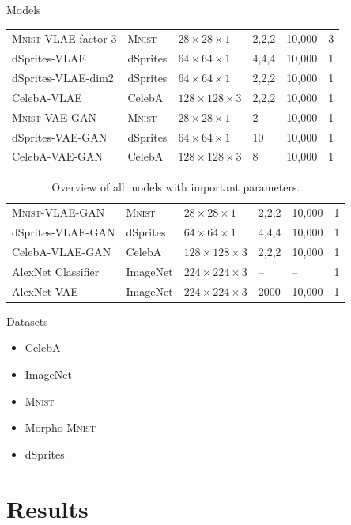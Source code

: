 \documentclass{beamer}
\begin{document}
\begin{frame}{Models}
\begin{table}[H]
\begin{tabularx}{\textwidth}{lXXXXX}
\textsc{Mnist}-VLAE-factor-3 & \textsc{Mnist} & $28\times 28\times 1$ & 2,2,2 & 10,000 & 3 \\
dSprites-VLAE & dSprites & $64\times 64\times 1$ & 4,4,4 & 10,000 & 1 \\
dSprites-VLAE-dim2 & dSprites & $64\times 64\times 1$ & 2,2,2 & 10,000 & 1 \\
CelebA-VLAE & CelebA & $128\times 128\times 3$ & 2,2,2 & 10,000 & 1 \\
\midrule
\textsc{Mnist}-VAE-GAN & \textsc{Mnist} & $28\times 28\times 1$ & 2 & 10,000 & 1\\
dSprites-VAE-GAN & dSprites & $64\times 64\times 1$ & 10 & 10,000 & 1\\
CelebA-VAE-GAN & CelebA & $128\times 128\times 3$ & 8 & 10,000 & 1\\
\end{tabularx}
\end{table}
\end{frame}
\begin{frame}
\fontsize{6pt}{7.2}\selectfont
\begin{table}[H]
\centering
\begin{tabularx}{\textwidth}{lXXXXX}
\textsc{Mnist}-VLAE-GAN & \textsc{Mnist} & $28\times 28\times 1$ & 2,2,2 & 10,000 & 1\\
dSprites-VLAE-GAN & dSprites & $64\times 64\times 1$ & 4,4,4 & 10,000 & 1\\
CelebA-VLAE-GAN & CelebA & $128\times 128\times 3$ & 2,2,2 & 10,000 & 1\\
\midrule
AlexNet Classifier & ImageNet & $224\times 224\times 3$ & -- & -- & 1\\
\midrule
AlexNet VAE & ImageNet & $224\times 224\times 3$ & 2000 & 10,000 & 1\\
\bottomrule
\end{tabularx}
\caption[Models Overview]{Overview of all models with important parameters.}
\end{table}
\end{frame}
\begin{frame}{Datasets}
\begin{itemize}
\item CelebA
\item ImageNet
\item \textsc{Mnist}
\item Morpho-\textsc{Mnist}
\item dSprites
\end{itemize}
\end{frame}
\section{Results}
\end{document}
